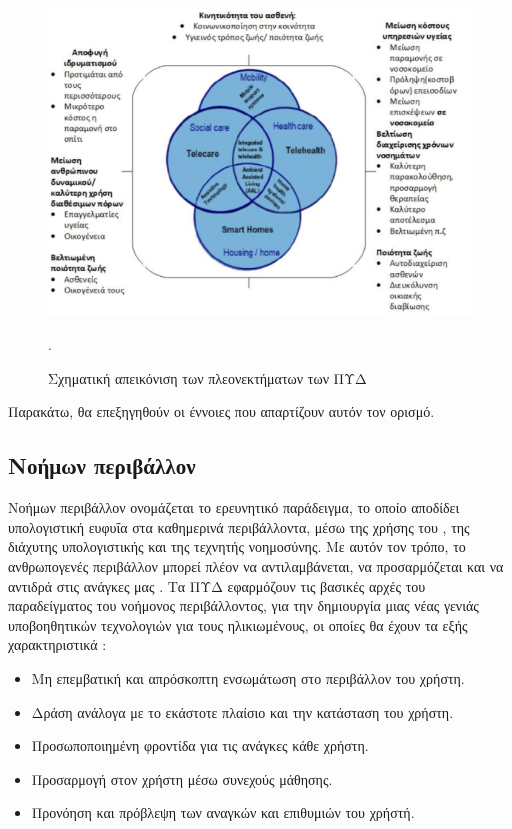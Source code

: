 \begin{figure}[h!]
\centering
\includegraphics[scale=0.9]{images/aal.png}
\caption{Σχηματική απεικόνιση των πλεονεκτήματων των ΠΥΔ}.
\label{aalpro}
\end{figure}

Παρακάτω, θα επεξηγηθούν οι έννοιες που απαρτίζουν αυτόν τον ορισμό.

\subsection{Νοήμων περιβάλλον}
Νοήμων περιβάλλον ονομάζεται το ερευνητικό παράδειγμα, το οποίο αποδίδει υπολογιστική ευφυΐα στα καθημερινά περιβάλλοντα, μέσω της χρήσης του , της διάχυτης υπολογιστικής και της τεχνητής νοημοσύνης.
Με αυτόν τον τρόπο, το ανθρωπογενές περιβάλλον μπορεί πλέον να αντιλαμβάνεται, να προσαρμόζεται και να αντιδρά στις ανάγκες μας \cite{Aarts2003}.
Τα ΠΥΔ εφαρμόζουν τις βασικές αρχές του παραδείγματος του νοήμονος περιβάλλοντος, για την δημιουργία μιας νέας γενιάς υποβοηθητικών τεχνολογιών για τους ηλικιωμένους, οι οποίες θα έχουν τα εξής χαρακτηριστικά \cite{Acampora2013}\cite{Blackman2016}:
\begin{itemize}
    \item Μη επεμβατική και απρόσκοπτη ενσωμάτωση στο περιβάλλον του χρήστη.
    \item Δράση ανάλογα με το εκάστοτε πλαίσιο και την κατάσταση του χρήστη. 
    \item Προσωποποιημένη φροντίδα για τις ανάγκες κάθε χρήστη. 
    \item Προσαρμογή στον χρήστη μέσω συνεχούς μάθησης.
    \item Προνόηση και πρόβλεψη των αναγκών και επιθυμιών του χρήστή.
\end{itemize}

